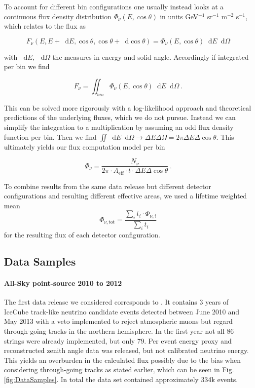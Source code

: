 \documentclass[%
 reprint,
 preprintnumbers,
 nofootinbib,
 amsmath,amssymb,
 aps,
]{revtex4-2}
\newcommand*\diff{\mathop{}\!\mathrm{d}}
\begin{document}
To account for different bin configurations one usually instead looks at a continuous flux density distribution $\Phi_\nu(E,\cos\theta)$ in units GeV$^{-1}$ sr$^{-1}$ m$^{-2}$ s$^{-1}$, which relates to the flux as

\begin{equation}
F_\nu(E,E+\diff E,\cos\theta,\cos\theta+\diff\cos\theta)=\Phi_\nu(E,\cos\theta)\diff E \diff\Omega
\end{equation}

with $\diff E,\ \diff\Omega$ the measures in energy and solid angle. Accordingly if integrated per bin we find

\begin{equation} \label{eq:flux_1}
F_\nu=\iint_{bin}\Phi_\nu(E,\cos\theta)\diff E \diff \Omega \ .
\end{equation}

This can be solved more rigorously with a log-likelihood approach and theoretical predictions of the underlying fluxes, which we do not pursue. Instead we can simplify the integration to a multiplication by assuming an odd flux density function per bin. Then we find $\iint \diff E \diff\Omega \rightarrow \Delta E \Delta \Omega = 2\pi \Delta E \Delta \cos\theta$. This ultimately yields our flux computation model per bin

\begin{equation} \label{eq:flux_2}
\Phi_\nu = \frac{N_\nu}{2\pi \cdot A_{\text{eff}} \cdot t \cdot \Delta E \Delta\cos\theta} \ .
\end{equation}

To combine results from the same data release but different detector configurations and resulting different effective areas, we used a lifetime weighted mean 
\begin{equation}
	\Phi_{\nu,\text{tot}} = \frac{\sum_i t_i \cdot \Phi_{\nu,i}}{\sum_i t_i}
\end{equation}
for the resulting flux of each detector configuration.

\subsection{Data Samples}

\paragraph{All-Sky point-source 2010 to 2012} The first data release we considered corresponds to \cite{AllSky}. It contains 3 years of IceCube track-like neutrino candidate events detected between June 2010 and May 2013 with a veto implemented to reject atmospheric muons but regard through-going tracks in the northern hemisphere. In the first year not all 86 strings were already implemented, but only 79. Per event energy proxy and reconstructed zenith angle data was released, but not calibrated neutrino energy. This yields an overburden in the calculated flux possibly due to the bias when considering through-going tracks as stated earlier, which can be seen in Fig. \ref{fig:DataSamples}. In total the data set contained approximately 334k events.
\end{document}
